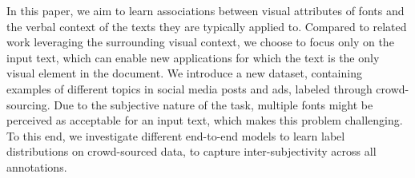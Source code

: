 In this paper, we aim to learn associations between visual attributes of fonts and the verbal context of the texts they are typically applied to. Compared to related work leveraging the surrounding visual context, we choose to focus only on the input text, which can enable new applications for which the text is the only visual element in the document. We introduce a new dataset, containing examples of different topics in social media posts and ads, labeled through crowd-sourcing. Due to the subjective nature of the task, multiple fonts might be perceived as acceptable for an input text, which makes this problem challenging. To this end, we investigate different end-to-end models to learn label distributions on crowd-sourced data, to capture inter-subjectivity across all annotations.
